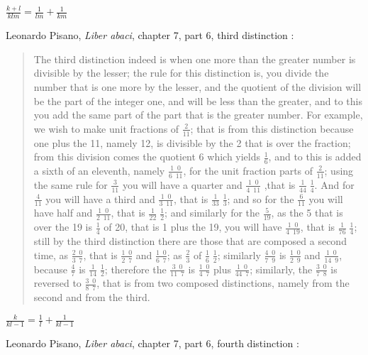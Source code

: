 \documentclass{article}
\begin{document}
$\frac{k+l}{klm} = \frac{1}{lm}+\frac{1}{km}$

Leonardo Pisano, {\em Liber abaci}, chapter 7, part 6, third distinction \cite[pp.~121--122]{abaci}:

\begin{quote}
The third distinction indeed is when one more than the greater number
is divisible by the lesser; the rule for this distinction is, you divide the number
that is one more by the lesser, and the quotient of the division will be the part of
the integer one, and will be less than the greater, and to this you add the same
part of the part that is the greater number. For example, we wish to make unit
fractions of $\frac{2}{11}$; that is from this distinction because one plus the 11, namely
12, is divisible by the 2 that is over the fraction; from this division comes the
quotient 6 which yields $\frac{1}{6}$, and to this is added a sixth of an eleventh, namely
$\frac{1 \enspace 0}{6 \enspace 11}$, for the unit fraction parts of $\frac{2}{11}$; using the same rule for $\frac{3}{11}$
you will have a
quarter and $\frac{1 \enspace 0}{4 \enspace 11}$ ,that is $\frac{1}{44} \; \frac{1}{4}$. And for $\frac{4}{11}$
you will have a third and $\frac{1 \enspace 0}{3 \enspace 11}$, that is
$\frac{1}{33} \; \frac{1}{3}$; and so for the $\frac{6}{11}$ you will have half and $\frac{1 \enspace 0}{2 \enspace 11}$,
that is $\frac{1}{22} \; \frac{1}{2}$; and similarly for
the $\frac{5}{19}$, as the 5 that is over the 19 is $\frac{1}{4}$ of 20, that is 1 plus the 19, you will have
$\frac{1 \enspace 0}{4 \enspace 19}$, that is $\frac{1}{76} \; \frac{1}{4}$;
still by the third distinction there are those that are composed
a second time, as $\frac{2 \enspace 0}{3 \enspace 7}$, that is $\frac{1 \enspace 0}{2 \enspace 7}$ and $\frac{1 \enspace 0}{6 \enspace 7}$;
as $\frac{2}{3}$ of $\frac{1}{6} \; \frac{1}{2}$; similarly $\frac{4 \enspace 0}{7 \enspace 9}$ is $\frac{1 \enspace 0}{2 \enspace 9}$
and $\frac{1 \enspace 0}{14 \enspace 9}$, because
$\frac{4}{7}$ is $\frac{1}{14} \; \frac{1}{2}$; therefore the $\frac{3 \enspace 0}{11 \enspace 7}$ is $\frac{1 \enspace 0}{4 \enspace 7}$
plus $\frac{1 \enspace 0}{44 \enspace 7}$; similarly, the $\frac{3 \enspace 0}{7 \enspace 8}$ is
reversed to $\frac{3 \enspace 0}{8 \enspace 7}$, that is from two composed distinctions, namely from the second
and from the third.
\end{quote}

$\frac{k}{kl-1} = \frac{1}{l} + \frac{1}{kl-1}$

Leonardo Pisano, {\em Liber abaci}, chapter 7, part 6, fourth distinction \cite[pp.~122--123]{abaci}:
\end{document}
